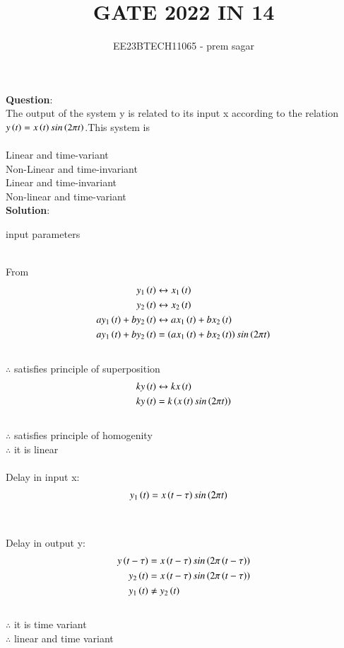 \documentclass[journal,12pt,twocolumn]{IEEEtran}
\theoremstyle{remark}
\begin{document}

\vspace{3cm}

\title{GATE 2022 IN 14}
\author{EE23BTECH11065 - prem sagar}
\maketitle
\newpage

\bigskip

\renewcommand{\thefigure}{\theenumi}
\renewcommand{\thetable}{\theenumi}
\textbf{Question}:
\\The output of the system y is related to its input x according to the relation $y\left(t\right)=x\left(t\right)sin\left(2\pi t\right)$.This system is 
\\\\ Linear and time-variant
\\ Non-Linear and time-invariant
\\ Linear and time-invariant
\\ Non-linear and time-variant
\\\textbf{Solution}:
\begin{table}[!ht]
\def\arraystretch{1.5}
   \centering
    \renewcommand\thetable{1}
      
    \caption{input parameters}
    \label{tab:IN 14}
 \end{table}
\\ From 
\\\begin{align}
y_1\left(t\right)&\leftrightarrow x_1\left(t\right)
\\y_2\left(t\right)&\leftrightarrow x_2\left(t\right)
\\ay_1\left(t\right)+by_2\left(t\right)&\leftrightarrow ax_1\left(t\right)+bx_2\left(t\right)
\\ay_1\left(t\right)+by_2\left(t\right)&=\left(ax_1\left(t\right)+bx_2\left(t\right)\right)sin\left(2\pi t\right)
\end{align}
\\$\therefore$ satisfies principle of superposition
\begin{align}
ky\left(t\right)&\leftrightarrow kx\left(t\right)
\\ky\left(t\right)&=k\left(x\left(t\right)sin\left(2\pi t\right)\right)
\end{align}
\\$\therefore$ satisfies principle of homogenity
\\$\therefore$ it is linear
\\\\Delay in input x:
\begin{align}
y_1\left(t\right)&=x\left(t-\tau\right)sin\left(2\pi t\right)
\end{align}
\\\\Delay in output y:
\begin{align}
y\left(t-\tau\right)&=x\left(t-\tau\right)sin\left(2\pi\left(t-\tau\right)\right)
\\y_2\left(t\right)&=x\left(t-\tau\right)sin\left(2\pi\left(t-\tau\right)\right)
\\y_1\left(t\right)&\neq y_2\left(t\right)
\end{align}
\\$\therefore$ it is time variant
\\$\therefore$  linear and time variant 
\end{document}
